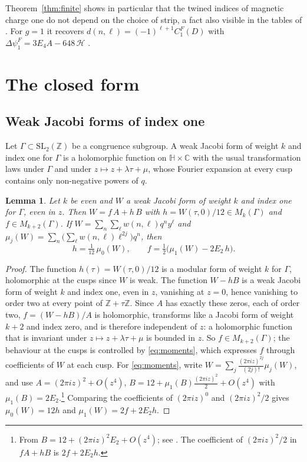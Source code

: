 \documentclass[11pt]{amsart}
\newtheorem{lemma}[theorem]{Lemma}
\theoremstyle{definition}
\newcommand{\ZZ}{\mathbb{Z}}
\newcommand{\CC}{\mathbb{C}}
\newcommand{\HH}{\mathbb{H}}
\newcommand{\cH}{\mathcal H}
\begin{document}
Theorem~\ref{thm:finite} shows in particular that the twined indices of magnetic charge one do not depend on the choice of strip, a fact also visible in the tables of \cite{GSSV23}. For $g=1$ it recovers $d(n,\ell)=(-1)^{\ell+1}C^F_1(D)$ with $\Delta\psi^F_1=3E_4A-648\,\cH$ \cite{BM13}.

\section{The closed form}\label{sec:closed}

\subsection{Weak Jacobi forms of index one}
Let $\Gamma\subset\mathrm{SL}_2(\ZZ)$ be a congruence subgroup. A weak Jacobi form of weight $k$ and index one for $\Gamma$ is a holomorphic function on $\HH\times\CC$ with the usual transformation laws under $\Gamma$ and under $z\mapsto z+\lambda\tau+\mu$, whose Fourier expansion at every cusp contains only non-negative powers of $q$.

\begin{lemma}\label{lem:structure}
Let $k$ be even and $W$ a weak Jacobi form of weight $k$ and index one for $\Gamma$, even in $z$. Then $W=f\,A+h\,B$ with $h=W(\tau,0)/12\in M_k(\Gamma)$ and $f\in M_{k+2}(\Gamma)$. If $W=\sum_n\sum_\ell w(n,\ell)q^ny^\ell$ and $\mu_j(W)=\sum_n\bigl(\sum_\ell w(n,\ell)\ell^{2j}\bigr)q^n$, then
\begin{equation}\label{eq:moments}
h=\tfrac1{12}\,\mu_0(W),\qquad f=\tfrac12\bigl(\mu_1(W)-2E_2\,h\bigr).
\end{equation}
\end{lemma}

\begin{proof}
The function $h(\tau)=W(\tau,0)/12$ is a modular form of weight $k$ for $\Gamma$, holomorphic at the cusps since $W$ is weak. The function $W-hB$ is a weak Jacobi form of weight $k$ and index one, even in $z$, vanishing at $z=0$, hence vanishing to order two at every point of $\ZZ+\tau\ZZ$. Since $A$ has exactly these zeros, each of order two, $f=(W-hB)/A$ is holomorphic, transforms like a Jacobi form of weight $k+2$ and index zero, and is therefore independent of $z$: a holomorphic function that is invariant under $z\mapsto z+\lambda\tau+\mu$ is bounded in $z$. So $f\in M_{k+2}(\Gamma)$; the behaviour at the cusps is controlled by \eqref{eq:moments}, which expresses $f$ through coefficients of $W$ at each cusp. For \eqref{eq:moments}, write $W=\sum_j\frac{(2\pi iz)^{2j}}{(2j)!}\mu_j(W)$, and use $A=(2\pi iz)^2+O(z^4)$, $B=12+\mu_1(B)\frac{(2\pi iz)^2}{2}+O(z^4)$ with $\mu_1(B)=2E_2$.\footnote{From $B=12+(2\pi iz)^2E_2+O(z^4)$; see \cite[Section~9]{EZ85}. The coefficient of $(2\pi iz)^2/2$ in $fA+hB$ is $2f+2E_2h$.} Comparing the coefficients of $(2\pi iz)^0$ and $(2\pi iz)^2/2$ gives $\mu_0(W)=12h$ and $\mu_1(W)=2f+2E_2h$.
\end{proof}
\end{document}
